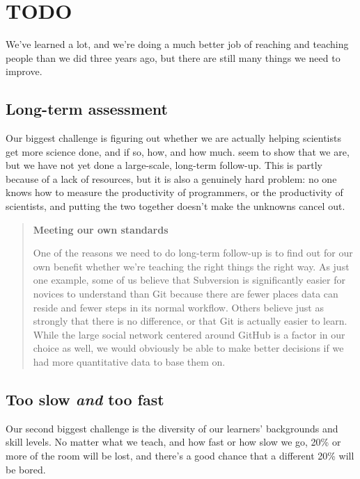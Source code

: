 \documentclass[10pt,a4paper,twocolumn]{article}
\begin{document}
\section{TODO}

We've learned a lot, and we're doing a much better job of reaching and
teaching people than we did three years ago, but there are still many
things we need to improve.

\subsection{Long-term assessment}\label{s:assessment}

Our biggest challenge is figuring out whether we are actually helping
scientists get more science done, and if so, how, and how much.
\cite{aranda2012,libarkin2012,schossau2014,simperler2015} seem to show
that we are, but we have not yet done a large-scale, long-term
follow-up. This is partly because of a lack of resources, but it is
also a genuinely hard problem: no one knows how to measure the
productivity of programmers, or the productivity of scientists, and
putting the two together doesn't make the unknowns cancel out.

\begin{quote}
\textbf{Meeting our own standards}

One of the reasons we need to do long-term follow-up is to find out
for our own benefit whether we're teaching the right things the right
way.  As just one example, some of us believe that Subversion is
significantly easier for novices to understand than Git because there
are fewer places data can reside and fewer steps in its normal
workflow. Others believe just as strongly that there is no difference,
or that Git is actually easier to learn. While the large social
network centered around GitHub is a factor in our choice as well, we
would obviously be able to make better decisions if we had more
quantitative data to base them on.
\end{quote}

\subsection{Too slow \emph{and} too fast}\label{s:instruction-pace}

Our second biggest challenge is the diversity of our learners'
backgrounds and skill levels. No matter what we teach, and how fast or
how slow we go, 20\% or more of the room will be lost, and there's a
good chance that a different 20\% will be bored.
\end{document}
